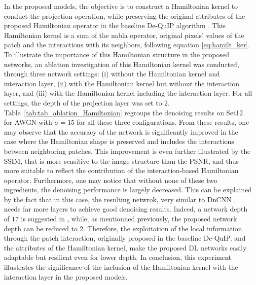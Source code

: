 \documentclass[10pt,journal,compsoc]{IEEEtran}
\newcommand{\dk}{\textcolor{black}}
\begin{document}
In the proposed models, the objective is to construct a Hamiltonian kernel to conduct the projection operation, while preserving the original attributes of the proposed Hamiltonian operator in the baseline De-QuIP algorithm \cite{dutta2022novel}. This Hamiltonian kernel is a sum of the nabla operator, original pixels' values of the patch and the interactions with its neighbors, following equation \eqref{eq:hamilt_ker}.
To illustrate the importance of this Hamiltonian structure in the proposed networks, an ablation investigation of this Hamiltonian kernel was conducted, through three network settings: (i) without the Hamiltonian kernel and interaction layer,
(ii) with the Hamiltonian kernel but without the interaction layer, and (iii) with the Hamiltonian kernel including the interaction layer. For all settings, the depth of the projection layer was set to 2. Table~\ref{tab:tab_ablation_Hamiltonian} regroups the denoising results on Set12 for AWGN with $\sigma = 15$ for all these three configurations. From these results, one may observe that the accuracy of the network is significantly improved in the case where the Hamiltonian shape is preserved and includes the interactions between neighboring patches. This improvement is even further illustrated by the SSIM, that is more sensitive to the image structure than the PSNR, and thus more suitable to reflect the contribution of the interaction-based Hamiltonian operator. 
Furthermore, one may notice that without none of these two ingredients, the denoising performance is largely decreased. This can be explained by the fact that in this case, the resulting netwrok, very similar to DnCNN \cite{Zhang2017beyond}, needs far more layers to achieve good denoising results. Indeed, a network depth of $17$ is suggested in \cite{Zhang2017beyond}, while, as mentionned \dk{previously}, the proposed network depth can be reduced to $2$.
Therefore, the exploitation of the local information through the \dk{patch} interaction, originally proposed in the baseline De-QuIP, and the attributes of the Hamiltonian kernel, make the proposed DL networks easily adaptable but resilient even for lower depth. 
In conclusion, this experiment illustrates the significance of the inclusion of the Hamiltonian kernel with the interaction layer in the proposed models.
\end{document}

